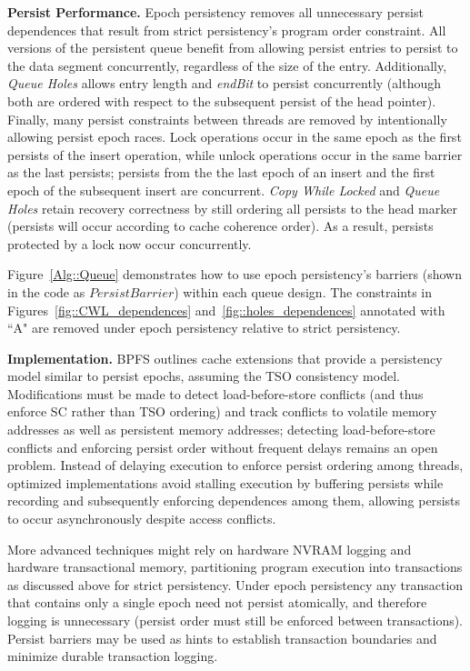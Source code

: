 \textbf{Persist Performance.}
Epoch persistency removes all unnecessary persist dependences that result from strict persistency's program order constraint.
All versions of the persistent queue benefit from allowing persist entries to persist to the data segment concurrently, regardless of the size of the entry.
Additionally, \emph{Queue Holes} allows entry length and \emph{endBit} to persist concurrently (although both are ordered with respect to the subsequent persist of the head pointer).
Finally, many persist constraints between threads are removed by intentionally allowing persist epoch races.
Lock operations occur in the same epoch as the first persists of the insert operation, while unlock operations occur in the same barrier as the last persists; persists from the the last epoch of an insert and the first epoch of the subsequent insert are concurrent.
\emph{Copy While Locked} and \emph{Queue Holes} retain recovery correctness by still ordering all persists to the head marker (persists will occur according to cache coherence order).
As a result, persists protected by a lock now occur concurrently.

Figure~\ref{Alg::Queue} demonstrates how to use epoch persistency's barriers (shown in the code as $PersistBarrier$) within each queue design.
The constraints in Figures~\ref{fig::CWL_dependences} and~\ref{fig::holes_dependences} annotated with ``A" are removed under epoch persistency relative to strict persistency.

\textbf{Implementation.}
BPFS \cite{ConditNightingale09} outlines cache extensions that provide a persistency model similar to persist epochs, assuming the TSO consistency model.
Modifications must be made to detect load-before-store conflicts (and thus enforce SC rather than TSO ordering) and track conflicts to volatile memory addresses as well as persistent memory addresses; detecting load-before-store conflicts and enforcing persist order without frequent delays remains an open problem.
Instead of delaying execution to enforce persist ordering among threads, optimized implementations avoid stalling execution by buffering persists while recording and subsequently enforcing dependences among them, allowing persists to occur asynchronously despite access conflicts.

More advanced techniques might rely on hardware NVRAM logging and hardware transactional memory, partitioning program execution into transactions as discussed above for strict persistency.
Under epoch persistency any transaction that contains only a single epoch need not persist atomically, and therefore logging is unnecessary (persist order must still be enforced between transactions).
Persist barriers may be used as hints to establish transaction boundaries and minimize durable transaction logging.

